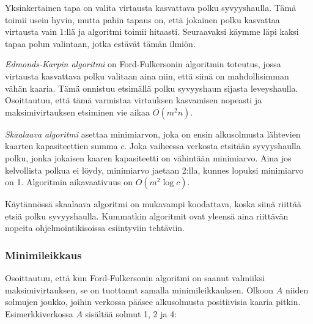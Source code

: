 Yksinkertainen tapa on valita virtausta kasvattava
polku syvyyshaulla.
Tämä toimii usein hyvin, mutta pahin tapaus on,
että jokainen polku
kasvattaa virtausta vain 1:llä ja algoritmi toimii hitaasti.
Seuraavaksi käymme läpi kaksi tapaa polun valintaan,
jotka estävät tämän ilmiön.

\textit{Edmonds-Karpin algoritmi} on
Ford-Fulkersonin algoritmin toteutus,
jossa virtausta kasvattava polku valitaan
aina niin, että siinä on mahdollisimman vähän kaaria.
Tämä onnistuu etsimällä polku syvyyshaun
sijasta leveyshaulla.
Osoittautuu, että tämä varmistaa virtauksen
kasvamisen nopeasti ja
maksimivirtauksen etsiminen vie aikaa $O(m^2 n)$.

\textit{Skaalaava algoritmi}
asettaa minimiarvon, joka on ensin alkusolmusta
lähtevien kaarten kapasiteettien summa $c$.
Joka vaiheessa verkosta etsitään
syvyyshaulla polku, jonka jokaisen kaaren kapasiteetti
on vähintään minimiarvo.
Aina jos kelvollista polkua ei löydy,
minimiarvo jaetaan 2:lla,
kunnes lopuksi minimiarvo on 1.
Algoritmin aikavaativuus on $O(m^2 \log c)$.

Käytännössä skaalaava algoritmi on mukavampi koodattava,
koska siinä riittää etsiä polku syvyyshaulla.
Kummatkin algoritmit ovat yleensä aina riittävän
nopeita ohjelmointikisoissa esiintyviin tehtäviin.

\subsubsection{Minimileikkaus}

Osoittautuu, että kun Ford-Fulkersonin algoritmi on saanut valmiiksi
maksimivirtauksen, se on tuottanut samalla minimileikkauksen.
Olkoon $A$ niiden solmujen joukko,
joihin verkossa pääsee
alkusolmusta positiivisia kaaria pitkin.
Esimerkkiverkossa $A$ sisältää solmut 1, 2 ja 4:

